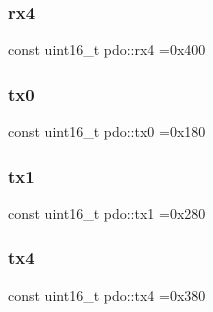 \mbox{\label{namespacepdo_ab45e1d027abca75c1d406d514d3f6085}} 
\subsubsection{\texorpdfstring{rx4}{rx4}}
{\footnotesize\ttfamily const uint16\+\_\+t pdo\+::rx4 =0x400}

\mbox{\label{namespacepdo_a4a8e678f87bbe2520c5cffe3f6a6dae0}} 
\subsubsection{\texorpdfstring{tx0}{tx0}}
{\footnotesize\ttfamily const uint16\+\_\+t pdo\+::tx0 =0x180}

\mbox{\label{namespacepdo_ae5f87d5007685cfd9d219e1cb051ccf0}} 
\subsubsection{\texorpdfstring{tx1}{tx1}}
{\footnotesize\ttfamily const uint16\+\_\+t pdo\+::tx1 =0x280}

\mbox{\label{namespacepdo_a12b62b143e83e83b2566dea6d20a169a}} 
\subsubsection{\texorpdfstring{tx4}{tx4}}
{\footnotesize\ttfamily const uint16\+\_\+t pdo\+::tx4 =0x380}

